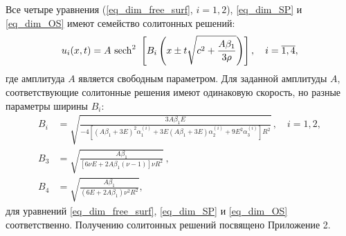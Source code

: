 \documentclass[12pt, a4paper]{report}
\begin{document}
Все четыре уравнения (\ref{eq_dim_free_surf}, $i=1,2$), \eqref{eq_dim_SP} и \eqref{eq_dim_OS} имеют семейство солитонных решений:
\begin{equation}\label{soliton}
u_i(x,t) = A\ {\rm sech}^2\ \left[B_{i} \left(x\pm t \sqrt{c^2+\frac{A \beta_1}{3 \rho}}\right) \right], \quad i = \overline {1,4},
\end{equation}
где амплитуда $A$ является свободным параметром. Для заданной амплитуды $A$, соответствующие солитонные решения имеют одинаковую скорость, но разные параметры ширины $B_i$:
\begin{align}
\label{Bi}
B_i &= \sqrt{\frac{3A\beta_1 E}{-4\left[(A\beta_1 + 3E)^2\alpha_1^{(i)} + 3E(A\beta_1 + 3E)\alpha_2^{(i)} + 9E^2\alpha_3^{(i)}\right] R^2}} \, , \quad i=1,2,\\
\label{B3}
B_3 &= \sqrt{\frac{A\beta_1}{\left[6\nu E + 2 A \beta_1 (\nu - 1)\right] \nu R^2}}\, , \\
\label{B4}
B_4 &= \sqrt{\frac{A\beta_1}{(6E + 2A\beta_1)\nu^2 R^2}},
\end{align}
для уравнений \eqref{eq_dim_free_surf}, \eqref{eq_dim_SP} и \eqref{eq_dim_OS} соответственно. Получению солитонных решений посвящено Приложение 2.
\end{document}
